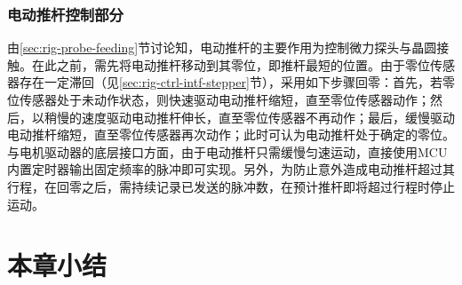 \subsubsection{电动推杆控制部分}\label{sec:rig-ctrl-mcu-stepper}

由\ref{sec:rig-probe-feeding}节讨论知，电动推杆的主要作用为控制微力探头与晶圆接触。在此之前，需先将电动推杆移动到其零位，即推杆最短的位置。由于零位传感器存在一定滞回（见\ref{sec:rig-ctrl-intf-stepper}节），采用如下步骤回零：首先，若零位传感器处于未动作状态，则快速驱动电动推杆缩短，直至零位传感器动作；然后，以稍慢的速度驱动电动推杆伸长，直至零位传感器不再动作；最后，缓慢驱动电动推杆缩短，直至零位传感器再次动作；此时可认为电动推杆处于确定的零位。与电机驱动器的底层接口方面，由于电动推杆只需缓慢匀速运动，直接使用MCU内置定时器输出固定频率的脉冲即可实现。另外，为防止意外造成电动推杆超过其行程，在回零之后，需持续记录已发送的脉冲数，在预计推杆即将超过行程时停止运动。


\section{本章小结}\label{sec:rig-summary}

